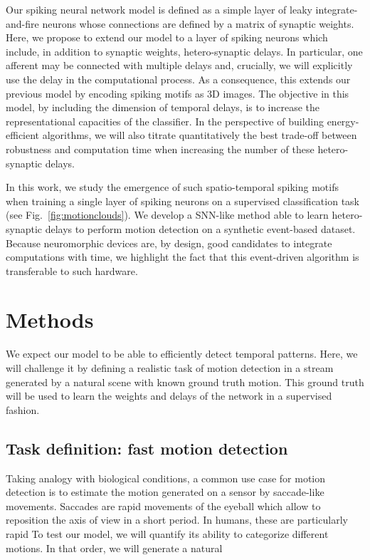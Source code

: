 \documentclass[default]{sn-jnl}%
\theoremstyle{thmstyleone}%
\theoremstyle{thmstyletwo}%
\theoremstyle{thmstylethree}%
\newcommand{\seeFig}[1]{see Fig.~\ref{fig:#1}}%
\begin{document}
Our spiking neural network model is defined as a simple layer of leaky integrate-and-fire neurons whose connections are defined by a matrix of synaptic weights. Here, we propose to extend our model to a layer of spiking neurons which include, in addition to synaptic weights, hetero-synaptic delays. In particular, one afferent may be connected with multiple delays and, crucially, we will explicitly use the delay in the computational process. As a consequence, this extends our previous model by encoding spiking motifs as 3D images. The objective in this model, by including the dimension of temporal delays, is to increase the representational capacities of the classifier. In the perspective of building energy-efficient algorithms, we will also titrate quantitatively the best trade-off between robustness and computation time when increasing the number of these hetero-synaptic delays. %

In this work, we study the emergence of such spatio-temporal spiking motifs when training a single layer of spiking neurons on a supervised classification task (\seeFig{motionclouds}). We develop a SNN-like method able to learn hetero-synaptic delays to perform motion detection on a synthetic event-based dataset. Because neuromorphic devices are, by design, good candidates to integrate computations with time, we highlight the fact that this event-driven algorithm is transferable to such hardware.
%
\section{Methods}
\label{sec:methods}
%
%
We expect our model to be able to efficiently detect temporal patterns. Here, we will challenge it by defining a realistic task of motion detection in a stream generated by a natural scene with known ground truth motion. This ground truth will be used to learn the weights and delays of the network in a supervised fashion.
%
\subsection{Task definition: fast motion detection}
%
Taking analogy with biological conditions, a common use case for motion detection is to estimate the motion generated on a sensor by saccade-like movements. Saccades are rapid movements of the eyeball which allow to reposition the axis of view in a short period. In humans, these are particularly rapid 
To test our model, we will quantify its ability to categorize different motions. In that order, we will generate a natural
\end{document}
